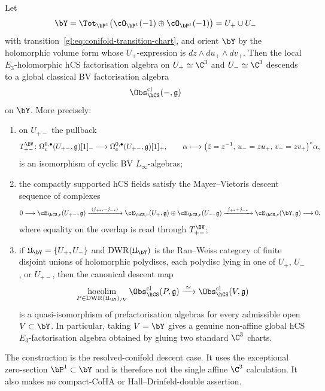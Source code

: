 \begin{theorem}
\label{thm:resolved-conifold-hcs-factorization-descent}
Let
\[
 \bY=\Tot_{\bP^1}\bigl(\cO_{\bP^1}(-1)\oplus\cO_{\bP^1}(-1)\bigr)
 =U_+\cup U_-
\]
with transition~\eqref{gl:eq:conifold-transition-chart}, and orient
\(\bY\) by the holomorphic volume form whose \(U_+\)-expression is
\(dz\wedge du_+\wedge dv_+\).  Then the local \(E_3\)-holomorphic
hCS factorisation algebra on \(U_+\simeq\C^3\) and
\(U_-\simeq\C^3\) descends to a global classical BV factorisation
algebra
\[
 \Obs_{\hCS}^{\mathrm{cl}}(-,\mathfrak g)
\]
on \(\bY\).  More precisely:
\begin{enumerate}
\item on \(U_{+-}\) the pullback
\[
 T_{+-}^{\BV}\colon
 \Omega_c^{0,\bullet}(U_{+-},\mathfrak g)[1]_{-}
 \longrightarrow
 \Omega_c^{0,\bullet}(U_{+-},\mathfrak g)[1]_{+},
 \qquad
 \alpha\longmapsto
 \bigl(\tilde z=z^{-1},\,u_-=zu_+,\,v_-=zv_+\bigr)^*\alpha ,
\]
is an isomorphism of cyclic BV \(L_\infty\)-algebras;
\item the compactly supported hCS fields satisfy the Mayer--Vietoris
descent sequence of complexes
\[
 0\longrightarrow
 \cE_{\hCS,c}(U_{+-},\mathfrak g)
 \xrightarrow{\ (j_{+*},-j_{-*})\ }
 \cE_{\hCS,c}(U_+,\mathfrak g)\oplus
 \cE_{\hCS,c}(U_-,\mathfrak g)
 \xrightarrow{\ j_{+*}+j_{-*}\ }
 \cE_{\hCS,c}(\bY,\mathfrak g)
 \longrightarrow 0 ,
\]
where equality on the overlap is read through \(T_{+-}^{\BV}\);
\item if \(\mathfrak U_{\bY}=\{U_+,U_-\}\) and
\(\mathrm{DWR}(\mathfrak U_{\bY})\) is the Ran--Weiss category of finite
disjoint unions of holomorphic polydiscs, each polydisc lying in one of
\(U_+\), \(U_-\), or \(U_{+-}\), then the canonical descent map
\[
 \operatorname*{hocolim}_{P\in\mathrm{DWR}(\mathfrak U_{\bY})_{/V}}
 \Obs_{\hCS}^{\mathrm{cl}}(P,\mathfrak g)
 \xrightarrow{\;\simeq\;}
 \Obs_{\hCS}^{\mathrm{cl}}(V,\mathfrak g)
\]
is a quasi-isomorphism of prefactorisation algebras for every admissible
open \(V\subset\bY\).  In particular, taking \(V=\bY\) gives a genuine
non-affine global hCS \(E_3\)-factorisation algebra obtained by gluing
two standard \(\C^3\) charts.
\end{enumerate}
The construction is the resolved-conifold descent case.  It uses the
exceptional zero-section \(\bP^1\subset\bY\) and is therefore not the
single affine \(\C^3\) calculation.  It also makes no compact-CoHA or
Hall--Drinfeld-double assertion.
\end{theorem}

